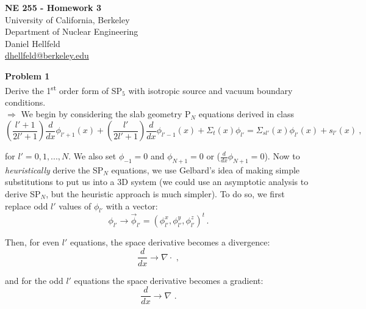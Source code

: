 \documentclass[10pt]{article}
\begin{document}
\begin{centering}
\textbf{\large NE 255 - Homework 3}\\
\vspace{11pt}
University of California, Berkeley\\
Department of Nuclear Engineering\\
\vspace{11pt}
Daniel Hellfeld\\
\href{mailto:dhellfeld@berkeley.edu}{dhellfeld@berkeley.edu}\\
\end{centering}




\vspace{22pt}
\noindent \textbf{Problem 1}\\
Derive the 1\textsuperscript{st} order form of SP$_5$ with isotropic source and vacuum boundary conditions. \\[5pt]


$\Rightarrow$ We begin by considering the slab geometry P$_N$ equations derived in class
%
\begin{equation*}
    \left(\frac{l'+1}{2l'+1}\right)\frac{d}{d x}\phi_{l'+1}(x) + \left(\frac{l'}{2l'+1}\right)\frac{d}{d x}\phi_{l'-1}(x) + \Sigma_t(x) \phi_{l'} = \Sigma_{sl'}(x)\phi_{l'}(x) + s_{l'}(x)\:,
\end{equation*}

for $l' = 0, 1, ... , N$. We also set $\phi_{-1}=0$ and $\phi_{N+1} = 0$ or ($\frac{d}{dx}\phi_{N+1}=0$). Now to \emph{heuristically} derive the SP$_N$ equations, we use Gelbard's idea of making simple substitutions to put us into a 3D system (we could use an asymptotic analysis to derive SP$_N$, but the heuristic approach is much simpler). To do so, we first replace odd $l'$ values of $\phi_{l'}$ with a vector:
%
\begin{equation*}
    \phi_{l'} \rightarrow \vec{\phi}_{l'} = (\phi_{l'}^x,\phi_{l'}^y,\phi_{l'}^z)^t\,.
\end{equation*}

Then, for even $l'$ equations, the space derivative becomes a divergence:
%
\begin{equation*}
    \frac{d}{dx} \rightarrow \nabla \cdot\,\,,
\end{equation*}

and for the odd $l'$ equations the space derivative becomes a gradient:
%
\begin{equation*}
    \frac{d}{dx} \rightarrow \nabla\,\,.
\end{equation*}
\end{document}
